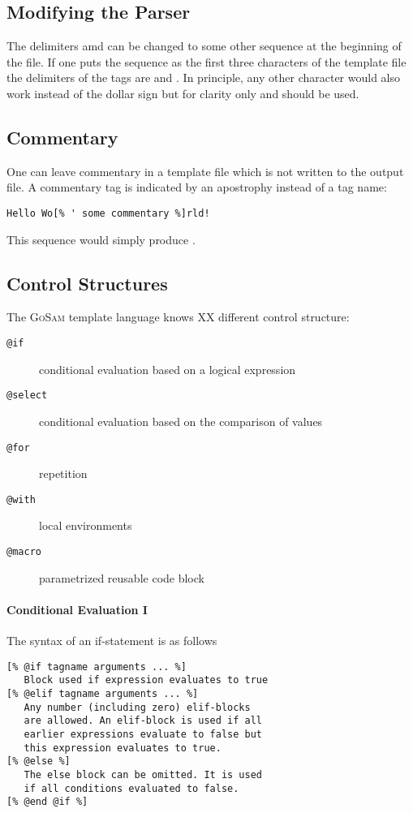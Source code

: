 \documentclass[11pt,a4paper]{refrep}
\newcommand{\golem}{\textsc{GoSam}\xspace}
\begin{document}
\subsection{Modifying the Parser}
The delimiters \lit{[\%} amd \lit{\%]} can be changed to some other
sequence at the beginning of the file. If one puts the sequence
\lit{\%=\$} as the first three characters of the template file
the delimiters of the tags are \lit{[\$]} and \lit{\$]}.
In principle, any other character would also work instead of the dollar
sign but for clarity only \lit{\%} and \lit{\$} should be used.

\subsection{Commentary}
One can leave commentary in a template file which is not written to the
output file. A commentary tag is indicated by an apostrophy instead of
a tag name:
\begin{lstlisting}[language=gosamt]
Hello Wo[% ' some commentary %]rld!
\end{lstlisting}
This sequence would simply produce .

\subsection{Control Structures}
The \golem{} template language knows XX different control structure:
\begin{description}
\item[\texttt{@if}] conditional evaluation based on a logical expression
\item[\texttt{@select}] conditional evaluation based on the comparison
    of values
\item[\texttt{@for}] repetition
\item[\texttt{@with}] local environments
\item[\texttt{@macro}] parametrized reusable code block
\end{description}

\paragraph{Conditional Evaluation I}
The syntax of an if-statement is as follows
\begin{lstlisting}[language=gosamt]
[% @if tagname arguments ... %]
   Block used if expression evaluates to true
[% @elif tagname arguments ... %]
   Any number (including zero) elif-blocks
   are allowed. An elif-block is used if all
   earlier expressions evaluate to false but
   this expression evaluates to true.
[% @else %]
   The else block can be omitted. It is used
   if all conditions evaluated to false.
[% @end @if %]
\end{lstlisting}
\end{document}
